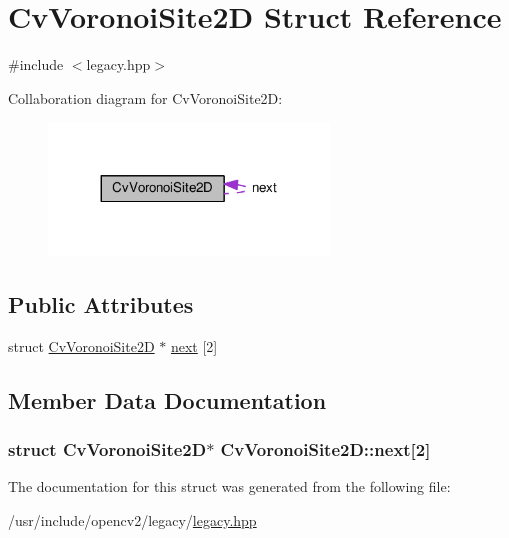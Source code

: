 \hypertarget{structCvVoronoiSite2D}{\section{Cv\-Voronoi\-Site2\-D Struct Reference}
\label{structCvVoronoiSite2D}
}


{\ttfamily \#include $<$legacy.\-hpp$>$}



Collaboration diagram for Cv\-Voronoi\-Site2\-D\-:\nopagebreak
\begin{figure}[H]
\begin{center}
\leavevmode
\includegraphics[width=212pt]{structCvVoronoiSite2D__coll__graph}
\end{center}
\end{figure}
\subsection*{Public Attributes}
\begin{DoxyCompactItemize}
\item 
struct \hyperlink{structCvVoronoiSite2D}{Cv\-Voronoi\-Site2\-D} $\ast$ \hyperlink{structCvVoronoiSite2D_a714084feac1bdada68a565ba95ae798d}{next} \mbox{[}2\mbox{]}
\end{DoxyCompactItemize}


\subsection{Member Data Documentation}
\hypertarget{structCvVoronoiSite2D_a714084feac1bdada68a565ba95ae798d}{
\subsubsection[{next}]{\setlength{\rightskip}{0pt plus 5cm}struct {\bf Cv\-Voronoi\-Site2\-D}$\ast$ Cv\-Voronoi\-Site2\-D\-::next\mbox{[}2\mbox{]}}}\label{structCvVoronoiSite2D_a714084feac1bdada68a565ba95ae798d}


The documentation for this struct was generated from the following file\-:\begin{DoxyCompactItemize}
\item 
/usr/include/opencv2/legacy/\hyperlink{legacy_8hpp}{legacy.\-hpp}\end{DoxyCompactItemize}
